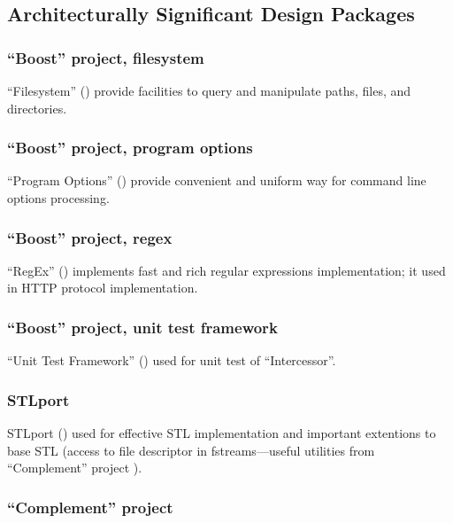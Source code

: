 \documentclass[a4paper,twoside]{article}
\newcommand{\Inter}{{\fontseries{b}\selectfont ``Intercessor''}}
\begin{document}
\subsection{Architecturally Significant Design Packages}

\subsubsection{``Boost'' project, filesystem}

``Filesystem'' (\cite{BoostProject:filesystem}) provide facilities to query and manipulate paths, files, and directories.

\subsubsection{``Boost'' project, program options}

``Program Options'' (\cite{BoostProject:programoptions}) provide convenient
and uniform way for command line options processing.

\subsubsection{``Boost'' project, regex}

``RegEx'' (\cite{BoostProject:regex}) implements fast and rich regular expressions
implementation; it used in HTTP protocol implementation.

\subsubsection{``Boost'' project, unit test framework}

``Unit Test Framework'' (\cite{BoostProject:testutf}) used for unit test of \Inter{}.

\subsubsection{STLport}

STLport (\cite{STLportProject}) used for effective STL implementation
and important extentions to base STL (access to file descriptor in fstreams---useful utilities from ``Complement'' project \cite{ComplementProject}).

\subsubsection{``Complement'' project}
\end{document}
